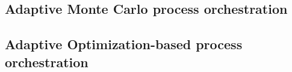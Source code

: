 \subsection{Adaptive Monte Carlo process orchestration}

\subsection{Adaptive Optimization-based process orchestration}



